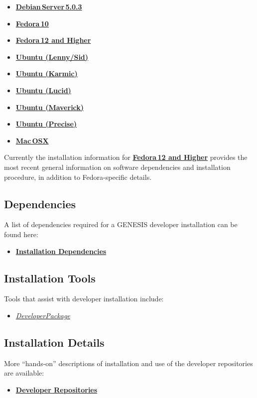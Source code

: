 \documentclass[12pt]{article}
\begin{document}
\begin{itemize}
   \item[]\href{../installation-debian-server/installation-debian-server.tex}{\bf Debian\,Server\,5.0.3}
   \item[]\href{../installation-fedora10/installation-fedora10.tex}{\bf Fedora\,10}
   \item[]\href{../installation-fedora12/installation-fedora12.tex}{\bf Fedora\,12 and Higher}
   \item[]\href{../installation-ubuntu-lennysid/installation-ubuntu-lennysid.tex}{\bf Ubuntu (Lenny/Sid)}
   \item[]\href{../installation-ubuntu-karmic/installation-ubuntu-karmic.tex}{\bf Ubuntu (Karmic)}
   \item[]\href{../installation-ubuntu-lucid/installation-ubuntu-lucid.tex}{\bf Ubuntu (Lucid)}
   \item[]\href{../installation-ubuntu-maverick/installation-ubuntu-maverick.tex}{\bf Ubuntu (Maverick)}
   \item[]\href{../installation-ubuntu-precise/installation-ubuntu-precise.tex}{\bf Ubuntu (Precise)}
   \item[]\href{../installation-osx/installation-osx.tex}{\bf Mac\,OSX}
\end{itemize}

Currently the installation information for
\href{../installation-fedora12/installation-fedora12.tex} {\bf
  Fedora\,12 and Higher} provides the most recent general information
on software dependencies and installation procedure, in addition to
Fedora-specific details.

\subsection*{Dependencies}
A list of dependencies required for a GENESIS developer installation can be found here:
\begin{itemize}
   \item[]\href{../genesis-dependencies/genesis-dependencies.tex}{\bf Installation Dependencies}
\end{itemize}

\subsection*{Installation Tools}
Tools that assist with developer installation include:
\begin{itemize}
   \item[]\href{../developer-package/developer-package.tex}{\it DeveloperPackage}
\end{itemize}

\subsection*{Installation Details}
More ``hands-on'' descriptions of installation and use of the developer repositories are available:
\begin{itemize}
   \item[]\href{../developer-repository/developer-repository.tex}{\bf Developer Repositories}
\end{itemize}
\end{document}

